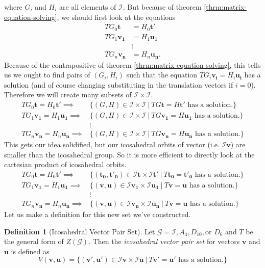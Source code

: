 \documentclass[a4paper,10pt]{article}
\theoremstyle{plain}
\theoremstyle{definition}
\newtheorem{Definition}[Theorem]{Definition}
\theoremstyle{remark}
\renewcommand{\vec}[1]{\mathbf{#1}}
\begin{document}
where \( G_i \) and \( H_i \) are all elements of \( \mathcal{I} \).
But because of theorem \ref{thrm:matrix-equation-solving}, we should first look at the equations
\begin{align*}
	TG_0\vec{t} &= H_0\vec{t'} \\
	TG_1\vec{v_1} &= H_1\vec{u_1} \\
	&\vdots \\
	TG_n\vec{v_n} &= H_n\vec{u_n}.
\end{align*}
Because of the contrapositive of theorem \ref{thrm:matrix-equation-solving}, this tells us we ought to find pairs of \( (G_i, H_i) \) such that the equation \( TG_i\vec{v_i} = H_i\vec{u_i} \) has a solution (and of course changing substituting in the translation vectors if \( i = 0 \)).
Therefore we will create many subsets of \( \mathcal{I} \times \mathcal{I} \).
\begin{align*}
	TG_0\vec{t} = H_0\vec{t'} \implies& \{(G, H) \in \mathcal{I} \times \mathcal{I} \ |\ TG\vec{t} = H\vec{t'} \text{ has a solution.}\} \\
	TG_1\vec{v_1} = H_1\vec{u_1}  \implies& \{(G, H) \in \mathcal{I} \times \mathcal{I} \ |\ TG\vec{v_1} = H\vec{u_1} \text{ has a solution.}\} \\
	&\vdots \\
	TG_n\vec{v_n} = H_n\vec{u_n}  \implies& \{(G, H) \in \mathcal{I} \times \mathcal{I} \ |\ TG\vec{v_n} = H\vec{u_n} \text{ has a solution.}\}
\end{align*}
This gets our idea solidified, but our icosahedral orbits of vector (i.e. \( \mathcal{I}\vec{v} \)) are smaller than the icosahedral group.
So it is more efficient to directly look at the cartesian product of icosahedral orbits.
\begin{align*}
	TG_0\vec{t} = H_0\vec{t'} \implies& \{(\vec{t_0}, \vec{t'_0}) \in \mathcal{I}\vec{t} \times \mathcal{I}\vec{t'} \ |\ T\vec{t_0} = \vec{t'_0} \text{ has a solution.}\} \\
	TG_1\vec{v_1} = H_1\vec{u_1}  \implies& \{(\vec{v}, \vec{u}) \in \mathcal{I}\vec{v_1} \times \mathcal{I}\vec{u_1} \ |\ T\vec{v} = \vec{u} \text{ has a solution.}\} \\
	&\vdots \\
	TG_n\vec{v_n} = H_n\vec{u_n}  \implies& \{(\vec{v}, \vec{u}) \in \mathcal{I}\vec{v_n} \times \mathcal{I}\vec{u_n} \ |\ T\vec{v} = \vec{u} \text{ has a solution.}\}
\end{align*}
Let us make a definition for this new set we've constructed.
\begin{Definition}[Icosahedral Vector Pair Set]
	Let \(\mathcal{G} = \mathcal{I}, A_4, D_{10}, \text{or } D_6\) and \( T \) be the general form of \( Z(\mathcal{G}) \).
	Then the \emph{icosahedral vector pair set} for vectors \( \vec{v} \) and \( \vec{u} \) is defined as
	\[V(\vec{v}, \vec{u}) = \{(\vec{v'}, \vec{u'}) \in \mathcal{I}\vec{v} \times \mathcal{I}\vec{u} \ |\ T\vec{v'} = \vec{u'} \text{ has a solution.}\}\]
\end{Definition}
\end{document}
